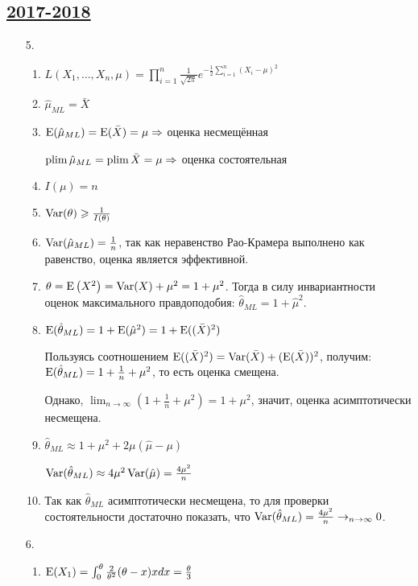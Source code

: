 \subsection[2017-2018]{\hyperref[sec:kr_03_2017_2018]{2017-2018}}
\label{sec:sol_kr_03_2017_2018}


\begin{enumerate}
\item[5.]
\begin{enumerate}
\item $L(X_1, \ldots, X_n, \mu) = \prod_{i=1}^n \frac{1}{\sqrt{2\pi}} e^{-\frac{1}{2}\sum_{i=1}^n (X_i - \mu)^2}$
\item $\hat\mu_{ML} = \bar X$
\item $\operatorname{E}(\hat\mu_{ML}) = \operatorname{E}(\bar X) = \mu \Rightarrow$ оценка несмещённая

$\operatorname*{plim} \hat \mu_{ML} = \operatorname*{plim} \bar X = \mu \Rightarrow$ оценка состоятельная
\item $I(\mu) = n$
\item $\operatorname{Var}(\theta) \geqslant \frac{1}{I(\theta)}$
\item $\operatorname{Var}(\hat \mu_{ML}) = \frac{1}{n}$, так как неравенство Рао-Крамера выполнено
как равенство, оценка является эффективной.
\item $\theta = \operatorname{E}\left(X^2\right) = \operatorname{Var}(X) + \mu^2 = 1 + \mu^2$.
Тогда в силу инвариантности оценок максимального правдоподобия: $\hat\theta_{ML} = 1 + \hat\mu^2$.
\item $\operatorname{E}(\hat \theta_{ML}) = 1 + \operatorname{E}(\hat \mu^2) = 1 + \operatorname{E}((\bar X)^2)$

Пользуясь соотношением $\operatorname{E}((\bar X)^2) = \operatorname{Var}(\bar X) + (\operatorname{E}(\bar X))^2$,
получим: $\operatorname{E}(\hat \theta_{ML}) = 1 + \frac{1}{n} + \mu^2$, то есть оценка смещена.

Однако, $\lim_{n \to \infty} \left(1 + \frac{1}{n} + \mu^2\right) = 1 + \mu^2$, значит,
оценка асимптотически несмещена.
\item $\hat \theta_{ML} \approx 1 + \mu^2 + 2\mu(\hat \mu - \mu)$

$\operatorname{Var}(\hat \theta_{ML}) \approx 4 \mu^2 \operatorname{Var}(\hat \mu) = \frac{4 \mu^2}{n}$
\item Так как $\hat \theta_{ML}$ асимптотически несмещена, то для проверки
состоятельности достаточно показать, что
$\operatorname{Var}(\hat \theta_{ML}) = \frac{4\mu^2}{n} \to_{n \to \infty} 0$.
\end{enumerate}
\item[6.]
\begin{enumerate}
\item $\operatorname{E}(X_1) = \int_{0}^{\theta} \frac{2}{\theta^2}(\theta - x)x dx = \frac{\theta}{3}$


\end{enumerate}
\end{enumerate}
